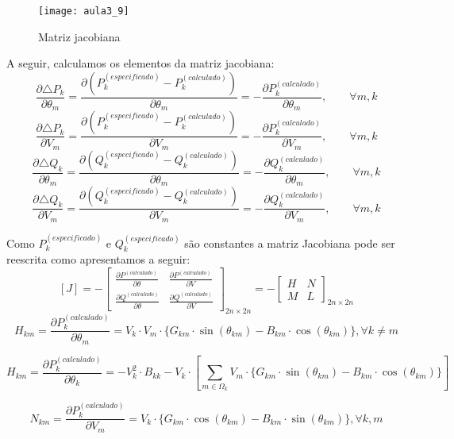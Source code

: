 \begin{figure}[H]
\begin{centering}
\texttt{[image: aula3\_9]}\protect\caption{\label{fig:aula3_9} Matriz jacobiana  }
\end{centering}
\end{figure}

A seguir, calculamos os elementos da matriz jacobiana:
\[
\frac{\partial\triangle P_{k}}{\partial\theta_{m}}=\frac{\partial(P_{k}^{(especificado)}-P_{k}^{(calculado)})}{\partial\theta_{m}}=-\frac{\partial P_{k}^{(calculado)}}{\partial\theta_{m}},\qquad\forall m,k
\]
\[
\frac{\partial\triangle P_{k}}{\partial V_{m}}=\frac{\partial(P_{k}^{(especificado)}-P_{k}^{(calculado)})}{\partial V_{m}}=-\frac{\partial P_{k}^{(calculado)}}{\partial V_{m}},\qquad\forall m,k
\]
\[
\frac{\partial\triangle Q_{k}}{\partial\theta_{m}}=\frac{\partial(Q_{k}^{(especificado)}-Q_{k}^{(calculado)})}{\partial\theta_{m}}=-\frac{\partial Q_{k}^{(calculado)}}{\partial\theta_{m}},\qquad\forall m,k
\]
\[
\frac{\partial\triangle Q_{k}}{\partial V_{m}}=\frac{\partial(Q_{k}^{(especificado)}-Q_{k}^{(calculado)})}{\partial V_{m}}=-\frac{\partial Q_{k}^{(calculado)}}{\partial V_{m}},\qquad\forall m,k
\]


Como $P_{k}^{(especificado)}$ e
$Q_{k}^{(especificado)}$ são constantes a matriz Jacobiana pode ser reescrita como apresentamos a seguir:
\[
[J]=- \begin{bmatrix} \frac { \partial { P }^{ (calculado) } }{ \partial \theta } & \frac { \partial { P }^{ (calculado) } }{ \partial V } \\ \frac { \partial { Q }^{ (calculado) } }{ \partial \theta } & \frac { \partial { Q }^{ (calculado) } }{ \partial V } \end{bmatrix}_{ 2n \times 2n }=-{ \begin{bmatrix} H & N \\ M & L \end{bmatrix} }_{ 2n \times 2n }
\]
\[
H_{km}=\frac{\partial P_{k}^{(calculado)}}{\partial\theta_{m}}=V_{k}\cdot V_{m}\cdot\{G_{km}\cdot\sin(\theta_{km})-B_{km}\cdot\cos(\theta_{km})\},\forall k\neq m
\]


\[
H_{km}=\frac{\partial P_{k}^{(calculado)}}{\partial\theta_{k}}=-V_{k}^{2}\cdot B_{kk}-V_{k}\cdot\left[\sum_{m\in\Omega_{k}}V_{m}\cdot\{G_{km}\cdot\sin(\theta_{km})-B_{km}\cdot\cos(\theta_{km})\}\right]
\]


\[
N_{km}=\frac{\partial P_{k}^{(calculado)}}{\partial V_{m}}=V_{k}\cdot\{G_{km}\cdot\cos(\theta_{km})-B_{km}\cdot\sin(\theta_{km})\},\forall k,m
\]


